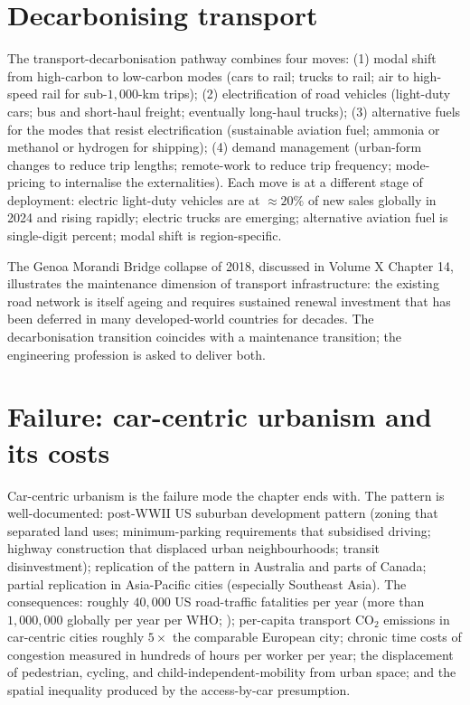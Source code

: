 \section{Decarbonising transport}

The transport-decarbonisation pathway combines four moves: (1) modal shift from high-carbon to low-carbon modes (cars to rail; trucks to rail; air to high-speed rail for sub-$1{,}000$-km trips); (2) electrification of road vehicles (light-duty cars; bus and short-haul freight; eventually long-haul trucks); (3) alternative fuels for the modes that resist electrification (sustainable aviation fuel; ammonia or methanol or hydrogen for shipping); (4) demand management (urban-form changes to reduce trip lengths; remote-work to reduce trip frequency; mode-pricing to internalise the externalities). Each move is at a different stage of deployment: electric light-duty vehicles are at $\approx 20\%$ of new sales globally in 2024 and rising rapidly; electric trucks are emerging; alternative aviation fuel is single-digit percent; modal shift is region-specific.

The Genoa Morandi Bridge collapse \cite{acc:mit-morandi-2018} of 2018, discussed in Volume X Chapter 14, illustrates the maintenance dimension of transport infrastructure: the existing road network is itself ageing and requires sustained renewal investment that has been deferred in many developed-world countries for decades. The decarbonisation transition coincides with a maintenance transition; the engineering profession is asked to deliver both.

\section{Failure: car-centric urbanism and its costs}

Car-centric urbanism is the failure mode the chapter ends with. The pattern is well-documented: post-WWII US suburban development pattern (zoning that separated land uses; minimum-parking requirements that subsidised driving; highway construction that displaced urban neighbourhoods; transit disinvestment); replication of the pattern in Australia and parts of Canada; partial replication in Asia-Pacific cities (especially Southeast Asia). The consequences: roughly $40{,}000$ US road-traffic fatalities per year (more than $1{,}000{,}000$ globally per year per WHO; \cite{web:who-road-safety-2023}); per-capita transport CO$_2$ emissions in car-centric cities roughly $5\times$ the comparable European city; chronic time costs of congestion measured in hundreds of hours per worker per year; the displacement of pedestrian, cycling, and child-independent-mobility from urban space; and the spatial inequality produced by the access-by-car presumption.

